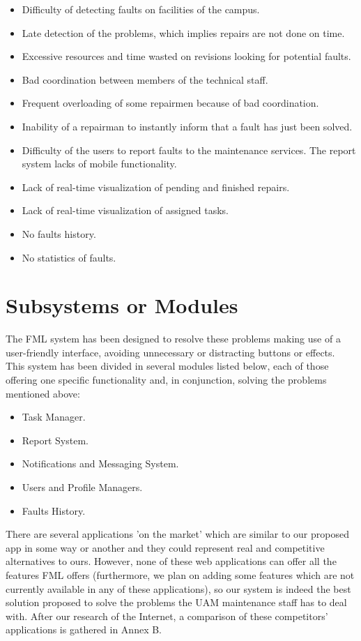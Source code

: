 \documentclass{report}
\begin{document}
\begin{itemize}
\item Difficulty of detecting faults on facilities of the campus.
\item Late detection of the problems, which implies repairs are not done on time.
\item Excessive resources and time wasted on revisions looking for potential faults.
\item Bad coordination between members of the technical staff.
\item Frequent overloading of some repairmen because of bad coordination.
\item Inability of a repairman to instantly inform that a fault has just been solved.
\item Difficulty of the users to report faults to the maintenance services.
The report system lacks of mobile functionality.
\item Lack of real-time visualization of pending and finished repairs.
\item Lack of real-time visualization of assigned tasks.
\item No faults history.
\item No statistics of faults.
\end{itemize}

\section{Subsystems or Modules}

The FML system has been designed to resolve these problems making use of a user-friendly interface, avoiding unnecessary or distracting buttons or effects. This system has been divided in several modules listed below, each of those offering one specific functionality and, in conjunction, solving the problems mentioned above:
\begin{itemize}
\item Task Manager.
\item Report System.
\item Notifications and Messaging System.
\item Users and Profile Managers.
\item Faults History.
\end{itemize}

There are several applications 'on the market' which are similar to our proposed app in some way or another and they could represent real and competitive alternatives to ours. However, none of these web applications can offer all the features FML offers (furthermore, we plan on adding some features which are not currently available in any of these applications), so our system is indeed the best solution proposed to solve the problems the UAM maintenance staff has to deal with. After our research of the Internet, a comparison of these competitors' applications is gathered in Annex B.
\end{document}
